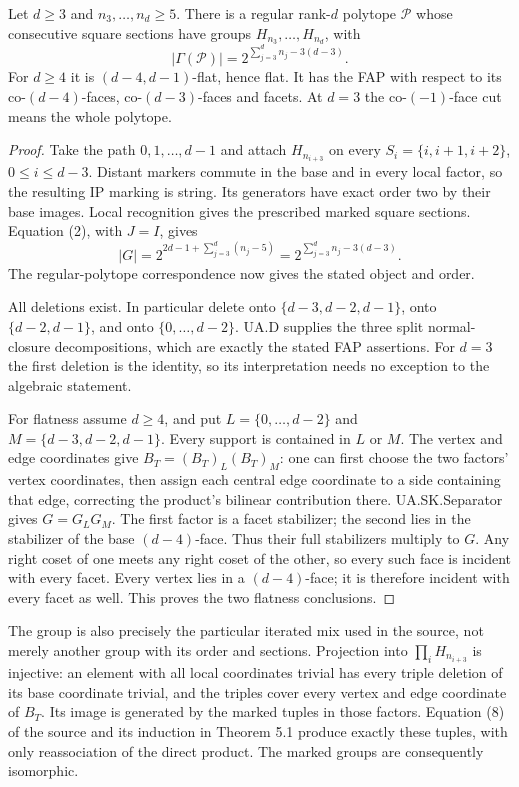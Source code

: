 \begin{theorem}
Let $d\ge3$ and $n_3,\ldots,n_d\ge5$. There is a regular rank-$d$
polytope $\mathcal P$ whose consecutive square sections have groups
$H_{n_3},\ldots,H_{n_d}$, with
\[
 |\Gamma(\mathcal P)|=2^{\sum_{j=3}^{d} n_j-3(d-3)}.        \tag{4}
\]
For $d\ge4$ it is $(d-4,d-1)$-flat, hence flat. It has the FAP with
respect to its co-$(d-4)$-faces, co-$(d-3)$-faces and facets.
At $d=3$ the co-$(-1)$-face cut means the whole polytope.
\end{theorem}
\begin{proof}
Take the path $0,1,\ldots,d-1$ and attach $H_{n_{i+3}}$ on every
$S_i=\{i,i+1,i+2\}$, $0\le i\le d-3$. Distant markers commute in
the base and in every local factor, so the resulting IP marking is string.
Its generators have exact order two by their base images. Local recognition
gives the prescribed marked square sections. Equation (2), with $J=I$,
gives
\[
 |G|=2^{2d-1+\sum_{j=3}^{d}(n_j-5)}
     =2^{\sum_{j=3}^{d}n_j-3(d-3)}.
\]
The regular-polytope correspondence now gives the stated object and order.

All deletions exist. In particular delete onto
$\{d-3,d-2,d-1\}$, onto $\{d-2,d-1\}$, and onto
$\{0,\ldots,d-2\}$. UA.D supplies the three split normal-closure
decompositions, which are exactly the stated FAP assertions. For $d=3$
the first deletion is the identity, so its interpretation needs no exception
to the algebraic statement.

For flatness assume $d\ge4$, and put
$L=\{0,\ldots,d-2\}$ and $M=\{d-3,d-2,d-1\}$. Every support is
contained in $L$ or $M$. The vertex and edge coordinates give
$B_T=(B_T)_L(B_T)_M$: one can first choose the two factors' vertex
coordinates, then assign each central edge coordinate to a side containing
that edge, correcting the product's bilinear contribution there.
UA.SK.Separator gives $G=G_LG_M$. The first factor is a facet stabilizer;
the second lies in the stabilizer of the base $(d-4)$-face. Thus their
full stabilizers multiply to $G$. Any right coset of one meets any right
coset of the other, so every such face is incident with every facet.
Every vertex lies in a $(d-4)$-face; it is therefore incident with every
facet as well. This proves the two flatness conclusions.
\end{proof}

The group is also precisely the particular iterated mix used in the source,
not merely another group with its order and sections. Projection into
$\prod_i H_{n_{i+3}}$ is injective: an element with all local coordinates
trivial has every triple deletion of its base coordinate trivial, and the
triples cover every vertex and edge coordinate of $B_T$. Its image is
generated by the marked tuples in those factors. Equation (8) of the source
and its induction in Theorem 5.1 produce exactly these tuples, with only
reassociation of the direct product. The marked groups are consequently
isomorphic.

